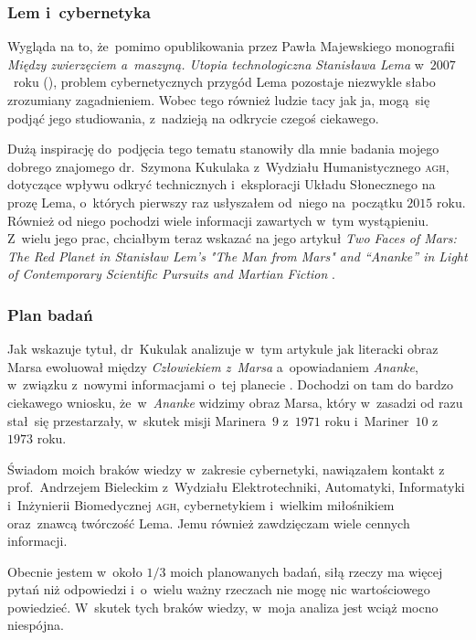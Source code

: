 \documentclass[10pt,t]{beamer}
\begin{document}
\begin{frame}
  \frametitle{Lem i~cybernetyka}


  Wygląda na to, że~pomimo opublikowania przez Pawła Majewskiego monografii
  \textit{Między zwierzęciem a~maszyną. Utopia technologiczna Stanisława
    Lema} w~$2007$~roku
  (\parencite{Majewski-Miedzy-zwierzeciem-a-maszyna-ETC-Pub-2007}), problem
  cybernetycznych przygód Lema pozostaje niezwykle słabo zrozumiany
  zagadnieniem. Wobec tego również ludzie tacy jak ja, mogą~się podjąć jego
  studiowania, z~nadzieją na odkrycie czegoś ciekawego.

  Dużą inspirację do~podjęcia tego tematu stanowiły dla mnie badania
  mojego dobrego znajomego
  {dr.~Szymona Kukulaka} z~Wydziału Humanistycznego \textsc{agh}, dotyczące
  wpływu odkryć technicznych i~eksploracji Układu Słonecznego na prozę
  Lema, o~których pierwszy raz usłyszałem od~niego na~początku $2015$ roku.
  Również od niego pochodzi wiele informacji zawartych w~tym wystąpieniu.
  Z~wielu jego prac, chciałbym teraz wskazać na jego artykuł \textit{Two
    Faces of Mars: The Red Planet in Stanisław Lem's "The Man from Mars" and
    “Ananke” in Light of Contemporary Scientific Pursuits and Martian
    Fiction} \parencite{Kukulak-Two-Faces-of-Mars-Pub-2023}.

\end{frame}





\begin{frame}
  \frametitle{Plan badań}


  Jak wskazuje tytuł, dr~Kukulak analizuje w~tym artykule jak literacki
  obraz Marsa ewoluował między \textit{Człowiekiem z~Marsa} a~opowiadaniem
  \textit{Ananke}, w~związku z~nowymi informacjami o~tej planecie
  \parencite{Kukulak-Two-Faces-of-Mars-Pub-2023}. Dochodzi on tam do bardzo
  ciekawego wniosku, że~w~\textit{Ananke} widzimy obraz Marsa, który
  w~zasadzi od razu stał~się przestarzały, w~skutek misji Marinera~$9$
  z~$1971$ roku i~Mariner~$10$ z~$1973$ roku.

  Świadom moich braków wiedzy w~zakresie cybernetyki, nawiązałem kontakt
  z~
  {prof.~Andrzejem Bieleckim} z~Wydziału Elektrotechniki, Automatyki,
  Informatyki i~Inżynierii Biomedycznej \textsc{agh}, cybernetykiem
  i~wielkim miłośnikiem oraz~znawcą twórczość Lema. Jemu również zawdzięczam
  wiele cennych informacji.

  Obecnie jestem w~około $1 / 3$ moich planowanych badań, siłą rzeczy
  ma więcej pytań niż odpowiedzi i~o~wielu ważny rzeczach nie mogę nic
  wartościowego powiedzieć. W~skutek tych braków wiedzy, w~moja analiza
  jest wciąż mocno niespójna.

\end{frame}
\end{document}

